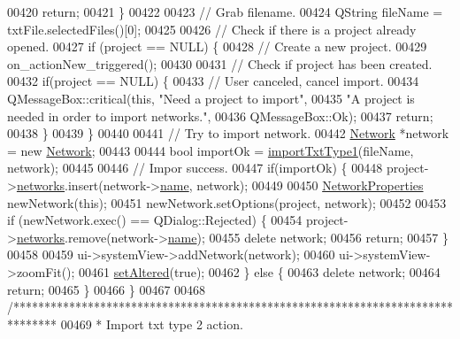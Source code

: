 \begin{DoxyCode}
00420     \textcolor{keywordflow}{return};
00421   \}
00422 
00423   \textcolor{comment}{// Grab filename.}
00424   QString fileName = txtFile.selectedFiles()[0];
00425 
00426   \textcolor{comment}{// Check if there is a project already opened.}
00427   \textcolor{keywordflow}{if} (project == NULL) \{
00428     \textcolor{comment}{// Create a new project.}
00429     on\_actionNew\_triggered();
00430 
00431     \textcolor{comment}{// Check if project has been created.}
00432     \textcolor{keywordflow}{if}(project == NULL) \{
00433       \textcolor{comment}{// User canceled, cancel import.}
00434       QMessageBox::critical(\textcolor{keyword}{this}, \textcolor{stringliteral}{"Need a project to import"},
00435                             \textcolor{stringliteral}{"A project is needed in order to import networks."},
00436                             QMessageBox::Ok);
00437       \textcolor{keywordflow}{return};
00438     \}
00439   \}
00440 
00441   \textcolor{comment}{// Try to import network.}
00442   \hyperlink{class_network}{Network} *network = \textcolor{keyword}{new} \hyperlink{class_network}{Network};
00443 
00444   \textcolor{keywordtype}{bool} importOk = \hyperlink{import_8cpp_ab30ac380d5e14f830ebc8eb839fbbdf0}{importTxtType1}(fileName, network);
00445 
00446   \textcolor{comment}{// Impor success.}
00447   \textcolor{keywordflow}{if}(importOk) \{
00448     project->\hyperlink{class_project_aa98126154cab59769a431668e6f17daf}{networks}.insert(network->\hyperlink{class_network_ab6643733a517f930c60b06f5ffd78186}{name}, network);
00449 
00450     \hyperlink{class_network_properties}{NetworkProperties} newNetwork(\textcolor{keyword}{this});
00451     newNetwork.setOptions(project, network);
00452 
00453     \textcolor{keywordflow}{if} (newNetwork.exec() == QDialog::Rejected) \{
00454       project->\hyperlink{class_project_aa98126154cab59769a431668e6f17daf}{networks}.remove(network->\hyperlink{class_network_ab6643733a517f930c60b06f5ffd78186}{name});
00455       \textcolor{keyword}{delete} network;
00456       \textcolor{keywordflow}{return};
00457     \}
00458 
00459     ui->systemView->addNetwork(network);
00460     ui->systemView->zoomFit();
00461     \hyperlink{group___window_ga4b63ea5ca52a9eea14db0a22b5a133f8}{setAltered}(\textcolor{keyword}{true});
00462   \} \textcolor{keywordflow}{else} \{
00463     \textcolor{keyword}{delete} network;
00464     \textcolor{keywordflow}{return};
00465   \}
00466 \}
00467 
00468 \textcolor{comment}{/*******************************************************************************}
00469 \textcolor{comment}{ * Import txt type 2 action.}

\end{DoxyCode}
